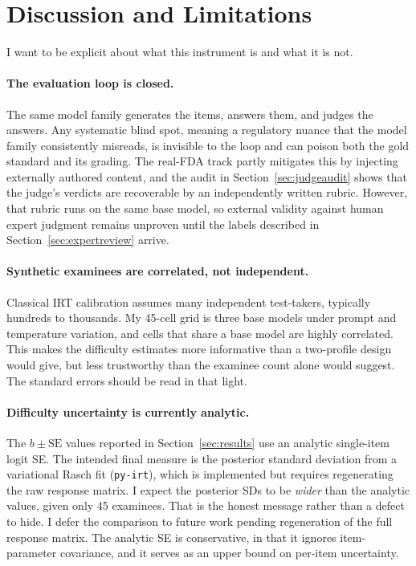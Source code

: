 \section{Discussion and Limitations}
\label{sec:discussion}

I want to be explicit about what this instrument is and what it is not.

\paragraph{The evaluation loop is closed.}
The same model family generates the items, answers them, and judges the
answers. Any systematic blind spot, meaning a regulatory nuance that the
model family consistently misreads, is invisible to the loop and can
poison both the gold standard and its grading. The real-FDA track partly
mitigates this by injecting externally authored content, and the audit in
Section~\ref{sec:judgeaudit} shows that the judge's verdicts are
recoverable by an independently written rubric. However, that rubric runs
on the same base model, so external validity against human expert
judgment remains unproven until the labels described in
Section~\ref{sec:expertreview} arrive.

\paragraph{Synthetic examinees are correlated, not independent.}
Classical IRT calibration assumes many independent test-takers, typically
hundreds to thousands. My 45-cell grid is three base models under prompt
and temperature variation, and cells that share a base model are highly
correlated. This makes the difficulty estimates more informative than a
two-profile design would give, but less trustworthy than the examinee
count alone would suggest. The standard errors should be read in that
light.

\paragraph{Difficulty uncertainty is currently analytic.}
The $b \pm \mathrm{SE}$ values reported in Section~\ref{sec:results} use
an analytic single-item logit SE. The intended final measure is the
posterior standard deviation from a variational Rasch fit
(\texttt{py-irt}), which is implemented but requires regenerating the raw
response matrix. I expect the posterior SDs to be \emph{wider} than the
analytic values, given only 45 examinees. That is the honest message
rather than a defect to hide. I defer the comparison to future work
pending regeneration of the full response matrix. The analytic SE is
conservative, in that it ignores item-parameter covariance, and it serves
as an upper bound on per-item uncertainty.


